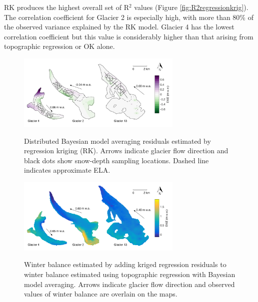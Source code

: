 \documentclass[onecolumn, letterpaper]{igs}
\newcommand{\topomap}{Arrows indicate glacier flow direction and black dots show snow-depth sampling locations. }
\newcommand{\swedots}{Arrows indicate glacier flow direction and observed values of winter balance are overlain on the maps. }
\begin{document}
RK produces the highest overall set of R$^2$ values (Figure \ref{fig:R2regressionkrig}). The correlation coefficient for Glacier 2 is especially high, with more than 80\% of the observed variance explained by the RK model. Glacier 4 has the lowest correlation coefficient but this value is considerably higher than that arising from topographic regression or OK alone. 

\begin{figure}
	\centering
	\includegraphics[width = 0.7\textwidth]{residualsKriged.png}\\
	\caption[Distributed Bayesian model averaging residuals estimated by regression kriging (RK)]{Distributed Bayesian model averaging residuals estimated by regression kriging (RK). \topomap Dashed line indicates approximate ELA.}
	\label{fig:residualsKRIGING}
\end{figure}

\begin{figure}
	\centering
	\includegraphics[width = 0.7\textwidth]{RegressionKriging.png}\\
	\caption[Winter balance estimated by adding kriged regression residuals to winter balance estimated using topographic regression with Bayesian model averaging]{Winter balance estimated by adding kriged regression residuals to winter balance estimated using topographic regression with Bayesian model averaging. \swedots}
	\label{fig:Regression-Kriging}
\end{figure}
\end{document}

